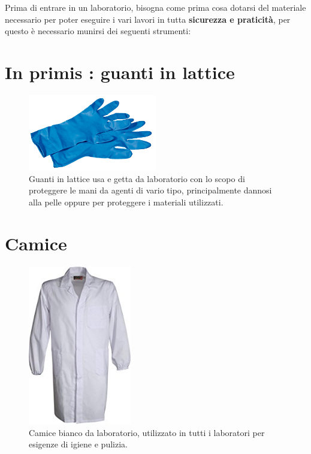 \documentclass{report}
\begin{document}
		Prima di entrare in un laboratorio, bisogna come prima cosa dotarsi del materiale necessario
		per poter eseguire i vari lavori in tutta \textbf{sicurezza e praticità}, per questo \`e necessario munirsi
		dei seguenti strumenti:



	\section{In primis : guanti in lattice}

	\begin{figure}[H]

		\includegraphics[width=0.5\textwidth]{./immagini/guanti.jpg}
		\caption{Guanti in lattice usa e getta da laboratorio con lo scopo di proteggere le mani da agenti di vario tipo,
		principalmente dannosi alla pelle	oppure per proteggere i materiali utilizzati.}
		\label{guanti}

	\end{figure}

	\vspace{0.5cm}


	\section{Camice}

	\begin{figure}[H]

		\includegraphics[width=0.4\textwidth]{./immagini/camice.jpg}
		\caption{Camice bianco da laboratorio, utilizzato in tutti i laboratori per esigenze di igiene e pulizia.}
		\label{camice}

	\end{figure}
\end{document}
